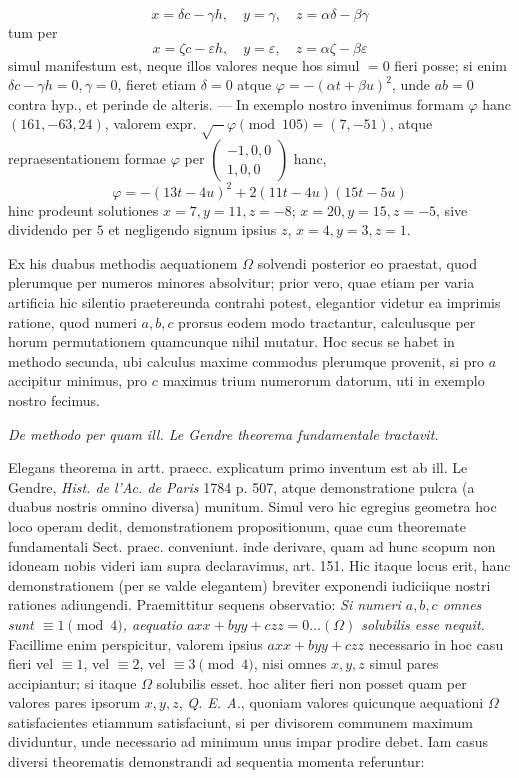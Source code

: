 \[
x=\delta c-\gamma h,\quad y=\gamma,\quad z=\alpha\delta-\beta\gamma
\]
tum per
\[
x=\zeta c-\varepsilon h,\quad y=\varepsilon,\quad z=\alpha\zeta-\beta\varepsilon
\]
simul manifestum est, neque illos valores neque hos simul \(=0\) fieri posse; si enim \(\delta c-\gamma h=0,\gamma=0\), fieret etiam \(\delta=0\) atque \(\varphi=-(\alpha t+\beta u)^2\), unde \(ab=0\) contra hyp., et perinde de alteris. --- In exemplo nostro invenimus formam \(\varphi\) hanc \((161,-63,24)\), valorem expr. \(\surd-\varphi\pmod{105}=(7,-51)\), atque repraesentationem formae \(\varphi\) per \(\left(\begin{smallmatrix}-1,0,0\\1,0,0\end{smallmatrix}\right)\) hanc,
\[
\varphi=-(13t-4u)^2+2(11t-4u)(15t-5u)
\]
hinc prodeunt solutiones \(x=7,y=11,z=-8\); \(x=20,y=15,z=-5\), sive dividendo per \(5\) et negligendo signum ipsius \(z\), \(x=4,y=3,z=1\).

Ex his duabus methodis aequationem \(\Omega\) solvendi posterior eo praestat, quod plerumque per numeros minores absolvitur; prior vero, quae etiam per varia artificia hic silentio praetereunda contrahi potest, elegantior videtur ea imprimis ratione, quod numeri \(a,b,c\) prorsus eodem modo tractantur, calculusque per horum permutationem quamcunque nihil mutatur. Hoc secus se habet in methodo secunda, ubi calculus maxime commodus plerumque provenit, si pro \(a\) accipitur minimus, pro \(c\) maximus trium numerorum datorum, uti in exemplo nostro fecimus.

\begin{center}\itshape De methodo per quam ill. Le Gendre theorema fundamentale tractavit.\end{center}
Elegans theorema in artt. praecc. explicatum primo inventum est ab ill. Le Gendre, \emph{Hist. de l'Ac. de Paris} 1784 p. 507, atque demonstratione pulcra (a duabus nostris omnino diversa) munitum. Simul vero hic egregius geometra hoc loco operam dedit, demonstrationem propositionum, quae cum theoremate fundamentali
Sect. praec. conveniunt. inde derivare, quam ad hunc scopum non idoneam nobis videri iam supra declaravimus, art. 151. Hic itaque locus erit, hanc demonstrationem (per se valde elegantem) breviter exponendi iudiciique nostri rationes adiungendi. Praemittitur sequens observatio: \emph{Si numeri \(a,b,c\) omnes sunt \(\equiv1\pmod4\), aequatio \(axx+byy+czz=0\ldots(\Omega)\) solubilis esse nequit.} Facillime enim perspicitur, valorem ipsius \(axx+byy+czz\) necessario in hoc casu fieri vel \(\equiv1\), vel \(\equiv2\), vel \(\equiv3\pmod4\), nisi omnes \(x,y,z\) simul pares accipiantur; si itaque \(\Omega\) solubilis esset. hoc aliter fieri non posset quam per valores pares ipsorum \(x,y,z\), \emph{Q. E. A.}, quoniam valores quicunque aequationi \(\Omega\) satisfacientes etiamnum satisfaciunt, si per divisorem communem maximum dividuntur, unde necessario ad minimum unus impar prodire debet. Iam casus diversi theorematis demonstrandi ad sequentia momenta referuntur:

